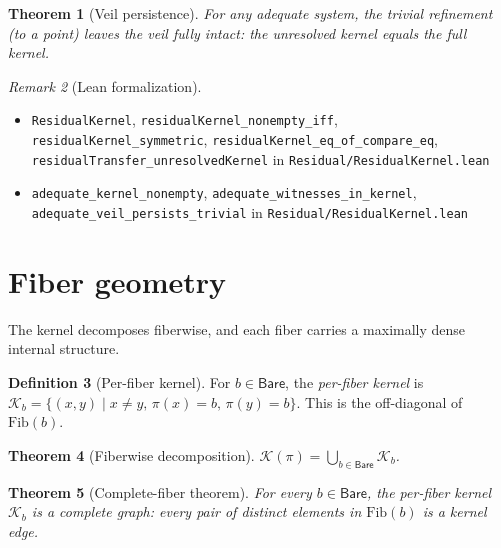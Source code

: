 \documentclass[11pt,a4paper]{article}
\theoremstyle{plain}
\newtheorem{theorem}{Theorem}[section]
\theoremstyle{definition}
\newtheorem{definition}[theorem]{Definition}
\theoremstyle{remark}
\newtheorem{remark}[theorem]{Remark}
\newcommand{\Bare}{\mathsf{Bare}}
\newcommand{\compare}{\pi}
\newcommand{\Fib}{\mathrm{Fib}}
\newcommand{\Ker}{\mathcal{K}}
\newcommand{\KerAt}{\mathcal{K}}
\begin{document}
\begin{theorem}[Veil persistence]\label{thm:veil}
For any adequate system, the trivial refinement (to a point) leaves the veil
fully intact: the unresolved kernel equals the full kernel.
\end{theorem}

\begin{remark}[Lean formalization]
\leavevmode\par\begin{itemize}[nosep,leftmargin=*,before=\raggedright]
\item \texttt{ResidualKernel}, \texttt{residualKernel\_nonempty\_iff}, \texttt{residualKernel\_symmetric}, \texttt{residualKernel\_eq\_of\_\allowbreak{}compare\_eq}, \texttt{residualTransfer\_\allowbreak{}unresolvedKernel} in \texttt{Residual/\allowbreak{}ResidualKernel.lean}
\item \texttt{adequate\_kernel\_nonempty}, \texttt{adequate\_witnesses\_in\_kernel}, \texttt{adequate\_veil\_persists\_trivial} in \texttt{Residual/ResidualKernel.lean}
\end{itemize}
\end{remark}

\section{Fiber geometry}\label{sec:fiber-geom}

The kernel decomposes fiberwise, and each fiber carries a maximally dense
internal structure.

\begin{definition}[Per-fiber kernel]\label{def:kernel-at}
For $b \in \Bare$, the \emph{per-fiber kernel} is
$\KerAt_b = \{(x,y) \mid x \neq y,\, \compare(x) = b,\, \compare(y) = b\}$.
This is the off-diagonal of $\Fib(b)$.
\end{definition}

\begin{theorem}[Fiberwise decomposition]\label{thm:fiber-decomp}
$\Ker(\compare) = \bigcup_{b \in \Bare} \KerAt_b$.
\end{theorem}

\begin{theorem}[Complete-fiber theorem]\label{thm:complete-fiber}
For every $b \in \Bare$, the per-fiber kernel $\KerAt_b$ is a
\emph{complete graph}: every pair of distinct elements in $\Fib(b)$
is a kernel edge.
\end{theorem}
\end{document}
